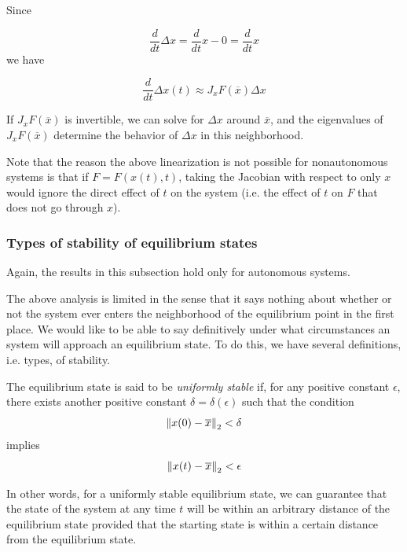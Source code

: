 Since

\begin{equation*}
  \frac{d}{dt}\Delta x = \frac{d}{dt} x - 0 = \frac{d}{dt} x
\end{equation*}
%
we have

\begin{equation*}
\frac{d}{dt}\Delta x(t) \approx J_x F(\overline{x}) \Delta x
\end{equation*}

If $J_x F(\overline{x})$ is invertible, we can solve for $\Delta x$ around $\overline{x}$, and the eigenvalues of $J_x F(\overline{x})$ determine the behavior of $\Delta x$ in this neighborhood.

Note that the reason the above linearization is not possible for nonautonomous systems is that if $F = F(x(t), t)$, taking the Jacobian with respect to only $x$ would ignore the direct effect of $t$ on the system (i.e. the effect of $t$ on $F$ that does not go through $x$).

\subsubsection{Types of stability of equilibrium states}

Again, the results in this subsection hold only for autonomous systems.

The above analysis is limited in the sense that it says nothing about whether or not the system ever enters the neighborhood of the equilibrium point in the first place. We would like to be able to say definitively under what circumstances an system will approach an equilibrium state. To do this, we have several definitions, i.e. types, of stability.

\begin{definition}
  The equilibrium state is said to be \emph{uniformly stable} if, for any positive constant $\epsilon$, there exists another positive constant $\delta = \delta(\epsilon)$ such that the condition
  \begin{equation*}
    \left\lVert x(0) - \overline{x} \right\rVert_2 < \delta
  \end{equation*}
  implies
  \begin{equation*}
    \left\lVert x(t) - \overline{x} \right\rVert_2 < \epsilon
  \end{equation*}
  \cite[p. 681]{Haykin:2009:NNC:1213811}
\end{definition}

In other words, for a uniformly stable equilibrium state, we can guarantee that the state of the system at any time $t$ will be within an arbitrary distance of the equilibrium state provided that the starting state is within a certain distance from the equilibrium state.

